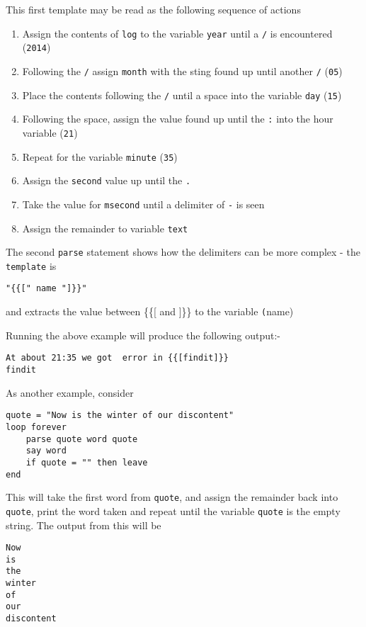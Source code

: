 {This first template may be read as the following sequence of actions
\begin{enumerate}
\item Assign the contents of \texttt{log} to the variable \texttt{year} until a \texttt{/} is encountered (\texttt{2014})
\item Following the \texttt{/} assign \texttt{month} with the sting found up until another \texttt{/} (\texttt{05})
\item Place the contents following the \texttt{/} until a space into the variable \texttt{day} (\texttt{15})
\item Following the space, assign the value found up until the \texttt{:} into the hour variable (\texttt{21})
\item Repeat for the variable \texttt{minute} (\texttt{35})
\item Assign the \texttt{second} value up until the \texttt{.}
\item Take the value for \texttt{msecond} until a delimiter of \texttt{-} is seen
\item Assign the remainder to variable \texttt{text}
\end{enumerate}

The second \texttt{parse} statement shows how the delimiters can be more complex - the \texttt{template} is 
\begin{verbatim}
"{{[" name "]}}"
\end{verbatim}
and extracts the value between \{\{[ and ]\}\} to the variable \texttt(name)

Running the above example will produce the following output:-
\begin{verbatim}
At about 21:35 we got  error in {{[findit]}} 
findit 
\end{verbatim}

As another example, consider
\begin{lstlisting}[label=WordSplitExample, caption=Parse Word-Split Example]
quote = "Now is the winter of our discontent"
loop forever
	parse quote word quote
	say word
	if quote = "" then leave
end
\end{lstlisting}
This will take the first word from \texttt{quote}, and assign the remainder back into \texttt{quote}, print the word taken and repeat until the variable \texttt{quote} is the empty string. The output from this will be
\begin{verbatim}
Now 
is 
the 
winter 
of 
our 
discontent
\end{verbatim}

}
